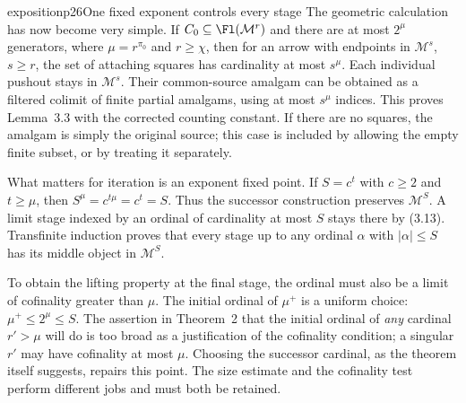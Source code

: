 \begin{dcomment}{exposition}{p26}{One fixed exponent controls every stage}
The geometric calculation has now become very simple. If $C_0\subseteq\Fl(\mathcal M^r)$ and there are at most $2^\mu$ generators, where $\mu=r^{\pi_0}$ and $r\geq\chi$, then for an arrow with endpoints in $\mathcal M^s$, $s\geq r$, the set of attaching squares has cardinality at most $s^\mu$. Each individual pushout stays in $\mathcal M^s$. Their common-source amalgam can be obtained as a filtered colimit of finite partial amalgams, using at most $s^\mu$ indices. This proves Lemma~3.3 with the corrected counting constant. If there are no squares, the amalgam is simply the original source; this case is included by allowing the empty finite subset, or by treating it separately.

What matters for iteration is an exponent fixed point. If $S=c^t$ with $c\geq2$ and $t\geq\mu$, then $S^\mu=c^{t\mu}=c^t=S$. Thus the successor construction preserves $\mathcal M^S$. A limit stage indexed by an ordinal of cardinality at most $S$ stays there by (3.13). Transfinite induction proves that every stage up to any ordinal $\alpha$ with $|\alpha|\leq S$ has its middle object in $\mathcal M^S$.

To obtain the lifting property at the final stage, the ordinal must also be a limit of cofinality greater than $\mu$. The initial ordinal of $\mu^+$ is a uniform choice: $\mu^+\leq2^\mu\leq S$. The assertion in Theorem~2 that the initial ordinal of \emph{any} cardinal $r'>\mu$ will do is too broad as a justification of the cofinality condition; a singular $r'$ may have cofinality at most $\mu$. Choosing the successor cardinal, as the theorem itself suggests, repairs this point. The size estimate and the cofinality test perform different jobs and must both be retained.
\end{dcomment}

